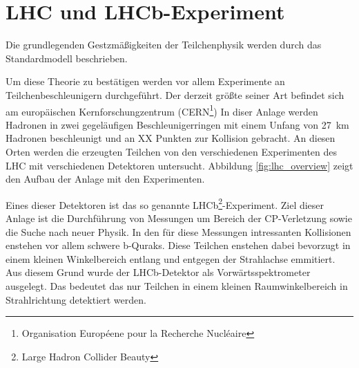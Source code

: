 \chapter{LHC und LHCb-Experiment}
Die grundlegenden Gestzmäßigkeiten der Teilchenphysik werden durch das Standardmodell beschrieben. 



Um diese Theorie zu bestätigen werden vor allem Experimente an Teilchenbeschleunigern durchgeführt.
Der derzeit größte seiner Art befindet sich am europäischen Kernforschungzentrum (CERN\footnote{Organisation Européene pour la Recherche Nucléaire})
In diser Anlage werden Hadronen in zwei gegeläufigen Beschleunigerringen mit einem Unfang von \SI{27}{\kilo\meter} Hadronen beschleunigt und an XX 
Punkten zur Kollision gebracht. An diesen Orten werden die erzeugten Teilchen von den verschiedenen Experimenten des LHC mit verschiedenen 
Detektoren untersucht. Abbildung \ref{fig:lhc_overview} zeigt den Aufbau der Anlage mit den Experimenten.

\noindent
Eines dieser Detektoren ist das so genannte LHCb\footnote{Large Hadron Collider Beauty}-Experiment. Ziel dieser Anlage ist die Durchführung
von Messungen um Bereich der CP-Verletzung sowie die Suche nach neuer Physik.
In den für diese Messungen intressanten Kollisionen enstehen vor allem schwere
b-Quraks. Diese Teilchen enstehen dabei bevorzugt in einem kleinen
Winkelbereich entlang und entgegen der Strahlachse emmitiert. Aus diesem Grund
wurde der LHCb-Detektor als Vorwärtsspektrometer ausgelegt. Das bedeutet das
nur Teilchen in einem kleinen Raumwinkelbereich in Strahlrichtung detektiert
werden.
